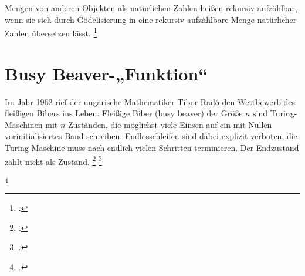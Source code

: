\documentclass{lehramt-informatik-haupt}
\begin{document}
Mengen von anderen Objekten als natürlichen Zahlen heißen rekursiv
aufzählbar, wenn sie sich durch Gödelisierung in eine rekursiv
aufzählbare Menge natürlicher Zahlen übersetzen lässt.
\footcite{wiki:rekursiv-aufzaehlbar}

%

\section{Busy Beaver-„Funktion“}

Im Jahr 1962 rief der ungarische Mathematiker Tibor Radó den Wettbewerb
des ﬂeißigen Bibers ins Leben. Fleißige Biber (busy beaver) der Größe
$n$ sind Turing-Maschinen mit $n$ Zuständen, die möglichst viele Einsen
auf ein mit Nullen vorinitialisiertes Band schreiben. Endlosschleifen
sind dabei explizit verboten, \dh die Turing-Maschine muss nach endlich
vielen Schritten terminieren. Der Endzustand zählt nicht als Zustand.
\footcite[Seite 337]{hoffmann}
\footcite{wiki:busy-beaver}

\footcite[Seite 26]{theo:fs:4}
\literatur
\end{document}
